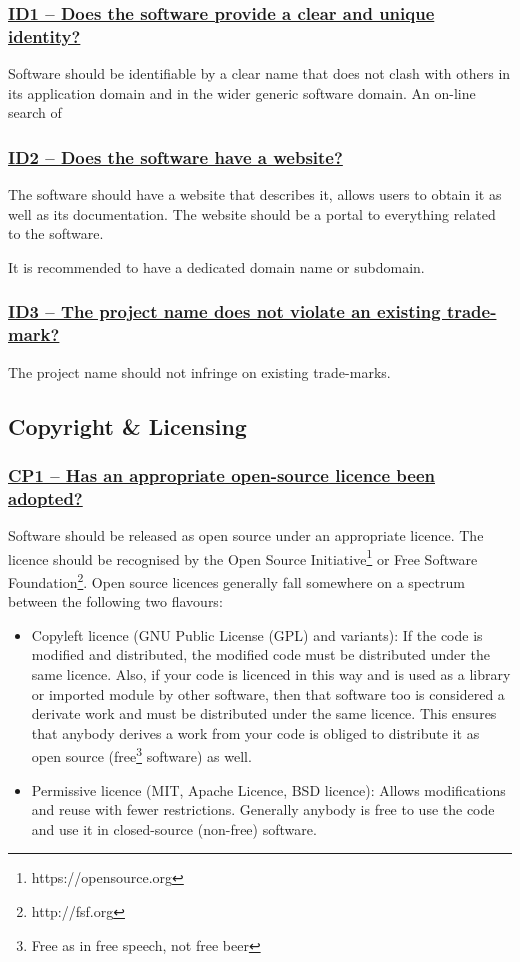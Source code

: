 \documentclass[a4paper,11pt]{article}
\newcommand{\indicator}[1]{\subsubsection*{\underline{#1}}}
\begin{document}
\indicator{ID1 -- Does the software provide a clear and unique identity?}

Software should be identifiable by a clear name that does not clash with others
in its application domain and in the wider generic software domain. An on-line
search of 

\indicator{ID2 -- Does the software have a website?}

The software should have a website that describes it, allows users to obtain
it as well as its documentation. The website should be a portal to everything
related to the software.

It is recommended to have a dedicated domain name or subdomain.

\indicator{ID3 -- The project name does not violate an existing trade-mark?}

The project name should not infringe on existing trade-marks.

\subsection{Copyright \& Licensing}

\indicator{CP1 -- Has an appropriate open-source licence been adopted?}

Software should be released as open source under an appropriate licence. The
licence should be recognised by the Open Source Initiative\footnote{https://opensource.org} or Free Software
Foundation\footnote{http://fsf.org}. Open source licences generally fall somewhere on a spectrum between the following two flavours:

\begin{itemize}
 \item Copyleft licence (GNU Public License (GPL) and variants): If the code is modified and distributed, the modified code must be distributed under the same licence. Also, if your code is licenced in this way and is used as a library or imported module by other software, then that software too is considered a derivate work and must be distributed under the same licence. This ensures that anybody derives a work from your code is obliged to distribute it as open source (free\footnote{Free as in free speech, not free beer} software) as well.
 \item Permissive licence (MIT, Apache Licence, BSD licence): Allows modifications and reuse with fewer restrictions. Generally anybody is free to use the code and use it in closed-source (non-free) software.
\end{itemize}
\end{document}
